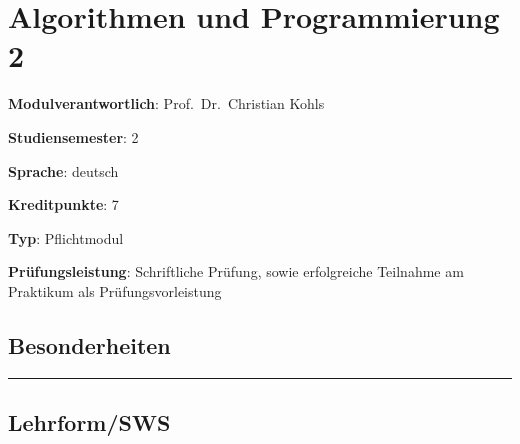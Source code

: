 \hypertarget{algorithmen-und-programmierung-2pathlabel....srcmodulbeschreibungen-bachelor-bpo5ba_algorithmenundprogrammierung2}{%
\chapter{Algorithmen und Programmierung
2\label{../../src/modulbeschreibungen-bachelor-bpo5/BA_AlgorithmenundProgrammierung2}}\label{algorithmen-und-programmierung-2pathlabel....srcmodulbeschreibungen-bachelor-bpo5ba_algorithmenundprogrammierung2}}

\begin{modulHead}
\textbf{Modulverantwortlich}: Prof.~Dr.~Christian
Kohls
\end{modulHead}
\begin{modulHead}
\textbf{Studiensemester}:
2
\end{modulHead}
\begin{modulHead}
\textbf{Sprache}:
deutsch
\end{modulHead}
\begin{modulHead}
\textbf{Kreditpunkte}:
7
\end{modulHead}
\begin{modulHead}
\textbf{Typ}:
Pflichtmodul
\end{modulHead}
\begin{modulHead}
\textbf{Prüfungsleistung}:
Schriftliche Prüfung, sowie erfolgreiche Teilnahme am Praktikum als
Prüfungsvorleistung
\end{modulHead}


\hypertarget{besonderheitenpathlabel....srcmodulbeschreibungen-bachelor-bpo5ba_algorithmenundprogrammierung2}{%
\section*{Besonderheiten\label{../../src/modulbeschreibungen-bachelor-bpo5/BA_AlgorithmenundProgrammierung2}}\label{besonderheitenpathlabel....srcmodulbeschreibungen-bachelor-bpo5ba_algorithmenundprogrammierung2}}

\begin{center}\rule{0.5\linewidth}{0.5pt}\end{center}

\hypertarget{lehrformswspathlabel....srcmodulbeschreibungen-bachelor-bpo5ba_algorithmenundprogrammierung2}{%
\section*{Lehrform/SWS\label{../../src/modulbeschreibungen-bachelor-bpo5/BA_AlgorithmenundProgrammierung2}}\label{lehrformswspathlabel....srcmodulbeschreibungen-bachelor-bpo5ba_algorithmenundprogrammierung2}}


